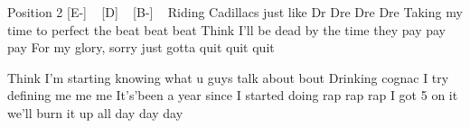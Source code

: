 Position 2
[E-] ~ [D] ~ [B-] ~
Riding Cadillacs just like Dr Dre Dre Dre
Taking my time to perfect the beat beat beat
Think I'll be dead by the time they pay pay pay
For my glory, sorry just gotta quit quit quit


Think I'm starting knowing what u guys talk about bout
Drinking cognac I try defining me me me
It's'been a year since I started doing rap rap rap
I got 5 on it we'll burn it up all day day day

